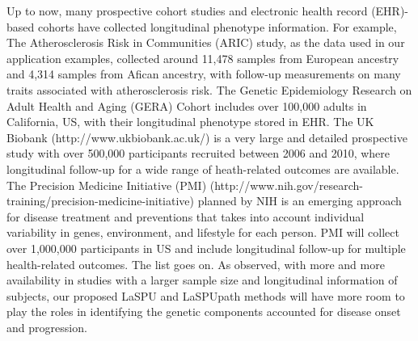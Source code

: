 \documentclass[12pt]{article}
\begin{document}
Up to now, many prospective cohort studies and electronic health record (EHR)-based cohorts have collected longitudinal phenotype information. For example, The Atherosclerosis Risk in Communities (ARIC) study, as the data used in our application examples, collected around 11,478 samples from European ancestry and 4,314 samples from Afican ancestry, with follow-up measurements on many traits associated with atherosclerosis risk. The Genetic Epidemiology Research on Adult Health and Aging (GERA) Cohort includes over 100,000 adults in California, US, with their longitudinal phenotype stored in EHR. The UK Biobank\cite{Sudlow2015} (http://www.ukbiobank.ac.uk/) is a very large and detailed prospective study with over 500,000 participants recruited between 2006 and 2010, where longitudinal follow-up for a wide range of heath-related outcomes are available. The Precision Medicine Initiative (PMI)\cite{Collins2015} (http://www.nih.gov/research-training/precision-medicine-initiative) planned by NIH is an emerging approach for disease treatment and preventions that takes into account individual variability in genes, environment, and lifestyle for each person. PMI will collect over 1,000,000 participants in US and include longitudinal follow-up for multiple health-related outcomes. The list goes on. As observed, with more and more availability in studies with a larger sample size and longitudinal information of subjects, our proposed LaSPU and LaSPUpath methods will have more room to play the roles in identifying the genetic components accounted for disease onset and progression.
\end{document}
